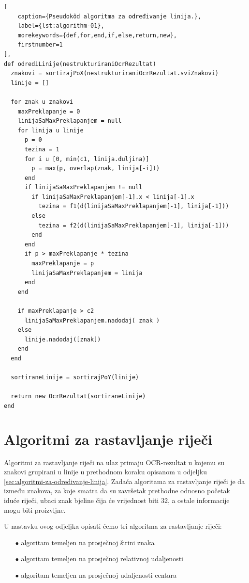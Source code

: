 \documentclass[times, utf8, zavrsni]{fer}
\begin{document}
\begin{lstlisting}[
    caption={Pseudokôd algoritma za određivanje linija.},
    label={lst:algorithm-01},
    morekeywords={def,for,end,if,else,return,new},
    firstnumber=1
],
def odrediLinije(nestrukturiraniOcrRezultat)
  znakovi = sortirajPoX(nestrukturiraniOcrRezultat.sviZnakovi)
  linije = []

  for znak u znakovi
    maxPreklapanje = 0
    linijaSaMaxPreklapanjem = null
    for linija u linije
      p = 0
      tezina = 1
      for i u [0, min(c1, linija.duljina)]
        p = max(p, overlap(znak, linija[-i]))
      end
      if linijaSaMaxPreklapanjem != null
        if linijaSaMaxPreklapanjem[-1].x < linija[-1].x
          tezina = f1(d(linijaSaMaxPreklapanjem[-1], linija[-1]))
        else
          tezina = f2(d(linijaSaMaxPreklapanjem[-1], linija[-1]))
        end
      end
      if p > maxPreklapanje * tezina
        maxPreklapanje = p
        linijaSaMaxPreklapanjem = linija
      end
    end

    if maxPreklapanje > c2
      linijaSaMaxPreklapanjem.nadodaj( znak )
    else
      linije.nadodaj([znak])
    end
  end

  sortiraneLinije = sortirajPoY(linije)

  return new OcrRezultat(sortiraneLinije)
end
\end{lstlisting}








\section{Algoritmi za rastavljanje riječi}
Algoritmi za rastavljanje riječi na ulaz primaju OCR-rezultat u kojemu su
znakovi grupirani u linije u prethodnom koraku opisanom u odjeljku
\ref{sec:algoritmi-za-odredivanje-linija}. Zadaća algoritama za rastavljanje
riječi je da između znakova, za koje smatra da su završetak prethodne odnosno
početak iduće riječi, ubaci znak bjeline čija će vrijednost  biti
$32$, a ostale informacije mogu biti proizvljne.

U nastavku ovog odjeljka opisati ćemo tri algoritma za rastavljanje riječi:
\begin{itemize}
    \item[$\bullet$] algoritam temeljen na prosječnoj širini znaka
    \item[$\bullet$] algoritam temeljen na prosječnoj relativnoj
                     udaljenosti
    \item[$\bullet$] algoritam temeljen na prosječnoj udaljenosti centara
\end{itemize}
\end{document}

